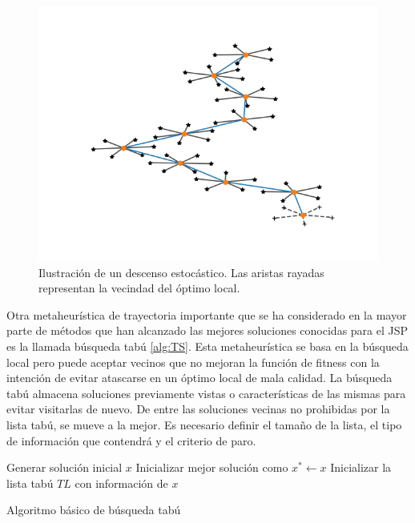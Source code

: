 \begin{figure}[H]
\centering
\includegraphics[scale=.7]{Imagenes/mettray.png}
    \caption{Ilustración de un descenso estocástico. Las aristas rayadas representan la vecindad del óptimo local.}
\end{figure}


Otra metaheurística de trayectoria importante que se ha considerado en la mayor parte de métodos que han alcanzado las mejores soluciones conocidas para el JSP es
la llamada búsqueda tabú \ref{alg:TS}. 
%
Esta metaheurística se basa en la búsqueda local pero puede aceptar vecinos que no mejoran la función de fitness con la intención de evitar atascarse en un óptimo 
local de mala calidad. 
%
La búsqueda tabú almacena soluciones previamente vistas o características de las mismas para evitar visitarlas de nuevo. 
%
De entre las soluciones vecinas no prohibidas por la lista tabú, se mueve a la mejor.
%
Es necesario definir el tamaño de la lista, el tipo de información que contendrá y el criterio de paro.

\begin{algorithm}[H]
 Generar solución inicial $x$\;
    Inicializar mejor solución como $x^*\leftarrow x$
 Inicializar la lista tabú $TL$ con información de $x$ \; 
    \label{alg:TS}
    \caption{Algoritmo básico de búsqueda tabú}
\end{algorithm}

